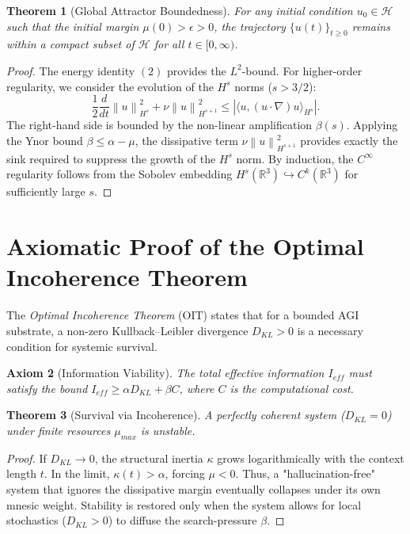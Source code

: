 \documentclass[11pt,a4paper]{amsart}
\newtheorem{theorem}{Theorem}[section]
\newtheorem{axiom}[theorem]{Axiom}
\newcommand{\alphacoeff}{\ensuremath{\alpha}}
\newcommand{\betacoeff}{\ensuremath{\beta}}
\newcommand{\kappacoeff}{\ensuremath{\kappa}}
\newcommand{\mumargin}{\ensuremath{\mu}}
\newcommand{\norm}[1]{\left\|#1\right\|}
\newcommand{\inner}[2]{\langle #1, #2 \rangle}
\begin{document}
{\begin{theorem}[Global Attractor Boundedness]
For any initial condition $u_0 \in \mathcal{H}$ such that the initial 
margin $\mumargin(0) > \epsilon > 0$, the trajectory $\{u(t)\}_{t \ge 0}$ 
remains within a compact subset of $\mathcal{H}$ for all $t \in [0, \infty)$.
\end{theorem}

\begin{proof}
The energy identity $(2)$ provides the $L^2$-bound. For higher-order 
regularity, we consider the evolution of the $H^s$ norms ($s > 3/2$):
\begin{equation}
 \frac{1}{2} \frac{d}{dt} \norm{u}_{H^s}^2 + \nu \norm{u}_{H^{s+1}}^2 
 \le \left| \inner{u}{(u \cdot \nabla)u}_{H^s} \right|.
\end{equation}
The right-hand side is bounded by the non-linear amplification $\betacoeff(s)$. 
Applying the Ynor bound $\betacoeff \le \alphacoeff - \mumargin$, the 
dissipative term $\nu \norm{u}_{H^{s+1}}^2$ provides exactly the 
sink required to suppress the growth of the $H^s$ norm. By induction, 
the $C^{\infty}$ regularity follows from the Sobolev embedding 
$H^s(\mathbb{R}^3) \hookrightarrow C^k(\mathbb{R}^3)$ for sufficiently large $s$.
\end{proof}

\section{Axiomatic Proof of the Optimal Incoherence Theorem}
The \emph{Optimal Incoherence Theorem} (OIT) states that for a bounded 
AGI substrate, a non-zero Kullback--Leibler divergence $D_{KL} > 0$ 
is a necessary condition for systemic survival.

\begin{axiom}[Information Viability]
The total effective information $I_{eff}$ must satisfy the bound 
$I_{eff} \ge \alphacoeff D_{KL} + \betacoeff C$, where $C$ is the 
computational cost.
\end{axiom}

\begin{theorem}[Survival via Incoherence]
A perfectly coherent system ($D_{KL} = 0$) under finite resources 
$\mumargin_{max}$ is unstable.
\end{theorem}

\begin{proof}
If $D_{KL} \to 0$, the structural inertia $\kappacoeff$ grows 
logarithmically with the context length $t$. In the limit, $\kappacoeff(t) 
> \alphacoeff$, forcing $\mumargin < 0$. Thus, a "hallucination-free" 
system that ignores the dissipative margin eventually collapses 
under its own mnesic weight. Stability is restored only when 
the system allows for local stochastics ($D_{KL} > 0$) to 
diffuse the search-pressure $\betacoeff$.
\end{proof}

}
\end{document}

